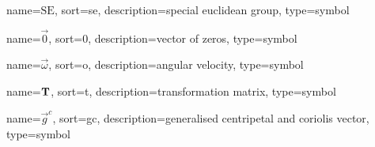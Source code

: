 	{%
		name=\ensuremath{\mathrm{SE}},
		sort=se,
		description=special euclidean group,
		type=symbol
	}
	\newcommand{\specialEuclideanGroupbare}{\gls{sym:specialEuclideanGroup}}
	\newcommand{\specialEuclideanGroup}[1]{\ensuremath{\specialEuclideanGroupbare_{#1}}}

	{%
		name=\ensuremath{\vec{0}},
		sort=0,
		description=vector of zeros,
		type=symbol
	}
	\newcommand{\zerovec}{\gls{sym:zerovec}}


	{%
		name=\ensuremath{\vec{\omega}},
		sort=o,
		description=angular velocity,
		type=symbol
	}
	\newcommand{\avel}{\gls{sym:avel}}

	{%
		name=\ensuremath{\mat{T}},
		sort=t,
		description=transformation matrix,
		type=symbol
	}
	\newcommand{\transformationmat}{\gls{sym:transformationmat}}

	{%
		name=\ensuremath{\vec{g}^c},
		sort=gc,
		description=generalised centripetal and coriolis vector,
		type=symbol
	}
	\newcommand{\centripitalCoriolisVec}{\gls{sym:centripitalCoriolisVec}}

